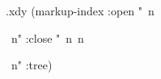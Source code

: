  
 
  
\begin{filecontents*}{\PROJ.xdy}
(markup-index :open  "~n
\begin{theindex}
  \providecommand*\lettergroupDefault[1]{}
  \providecommand*\lettergroup[1]{%
    \textsf{#1}
    \nopagebreak
  }
  ~n"
  :close "~n~n\end{theindex}~n"
:tree)
\end{filecontents*}

